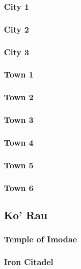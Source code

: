 		\subsubsection{City 1}
	
		\subsubsection{City 2}
	
		\subsubsection{City 3}
	
		\subsubsection{Town 1}

		\subsubsection{Town 2}

		\subsubsection{Town 3}

		\subsubsection{Town 4}

		\subsubsection{Town 5}

		\subsubsection{Town 6}

	\subsection{Ko' Rau}

		\subsubsection{Temple of Imodae}

		\subsubsection{Iron Citadel}

